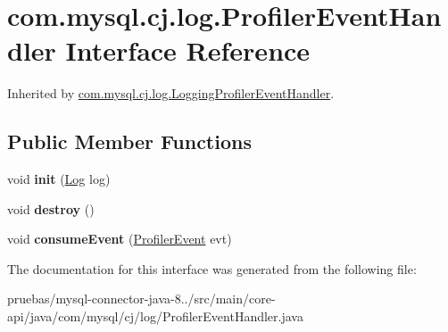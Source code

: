 \hypertarget{interfacecom_1_1mysql_1_1cj_1_1log_1_1_profiler_event_handler}{}\section{com.\+mysql.\+cj.\+log.\+Profiler\+Event\+Handler Interface Reference}
\label{interfacecom_1_1mysql_1_1cj_1_1log_1_1_profiler_event_handler}


Inherited by \mbox{\hyperlink{classcom_1_1mysql_1_1cj_1_1log_1_1_logging_profiler_event_handler}{com.\+mysql.\+cj.\+log.\+Logging\+Profiler\+Event\+Handler}}.

\subsection*{Public Member Functions}
\begin{DoxyCompactItemize}
\item 
\mbox{\label{interfacecom_1_1mysql_1_1cj_1_1log_1_1_profiler_event_handler_a09601bf613bfb6c51735f6bcbc15ebc7}} 
void {\bfseries init} (\mbox{\hyperlink{interfacecom_1_1mysql_1_1cj_1_1log_1_1_log}{Log}} log)
\item 
\mbox{\label{interfacecom_1_1mysql_1_1cj_1_1log_1_1_profiler_event_handler_a16c177c9284c3767ba723f61946a8632}} 
void {\bfseries destroy} ()
\item 
\mbox{\label{interfacecom_1_1mysql_1_1cj_1_1log_1_1_profiler_event_handler_a5b43ed803ec37646b7f7be0c2b1e6b90}} 
void {\bfseries consume\+Event} (\mbox{\hyperlink{interfacecom_1_1mysql_1_1cj_1_1log_1_1_profiler_event}{Profiler\+Event}} evt)
\end{DoxyCompactItemize}


The documentation for this interface was generated from the following file\+:\begin{DoxyCompactItemize}
\item 
pruebas/mysql-\/connector-\/java-\/8../src/main/core-\/api/java/com/mysql/cj/log/Profiler\+Event\+Handler.\+java\end{DoxyCompactItemize}
